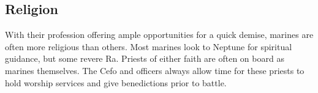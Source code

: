 \begin{multicols*}{2}
\section{Religion}

With their profession offering ample opportunities for a quick demise, marines are often more religious than others. Most marines look to Neptune for spiritual guidance, but some revere Ra. Priests of either faith are often on board as marines themselves. The Cefo and officers always allow time for these priests to hold worship services and give benedictions prior to battle.

\end{multicols*}